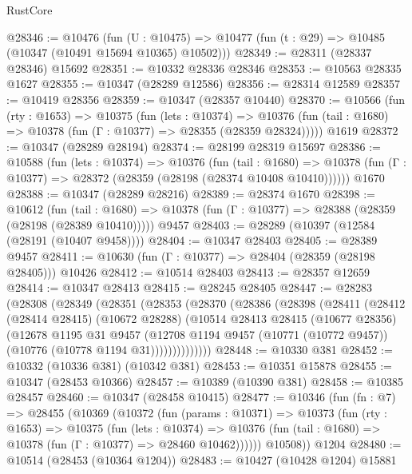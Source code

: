 \begin{lexlean}{RustCore}
\begin{coremodule}
@28346 := @10476
    (fun (U : @10475) => @10477 (fun (t : @29) => @10485 (@10347 (@10491 @15694 @10365) @10502)))
@28349 := @28311 (@28337 @28346) @15692
@28351 := @10332 @28336 @28346
@28353 := @10563 @28335 @1627
@28355 := @10347 (@28289 @12586)
@28356 := @28314 @12589
@28357 := @10419 @28356
@28359 := @10347 (@28357 @10440)
@28370 := @10566
    (fun (rty : @1653) =>
    @10375
      (fun (lets : @10374) =>
      @10376 (fun (tail : @1680) => @10378 (fun (Γ : @10377) => @28355 (@28359 @28324)))))
    @1619
@28372 := @10347 (@28289 @28194)
@28374 := @28199 @28319 @15697
@28386 := @10588
    (fun (lets : @10374) =>
    @10376
      (fun (tail : @1680) =>
      @10378 (fun (Γ : @10377) => @28372 (@28359 (@28198 (@28374 @10408 @10410))))))
    @1670
@28388 := @10347 (@28289 @28216)
@28389 := @28374 @1670
@28398 := @10612
    (fun (tail : @1680) => @10378 (fun (Γ : @10377) => @28388 (@28359 (@28198 (@28389 @10410)))))
    @9457
@28403 := @28289 (@10397 (@12584 (@28191 (@10407 @9458))))
@28404 := @10347 @28403
@28405 := @28389 @9457
@28411 := @10630 (fun (Γ : @10377) => @28404 (@28359 (@28198 @28405))) @10426
@28412 := @10514 @28403
@28413 := @28357 @12659
@28414 := @10347 @28413
@28415 := @28245 @28405
@28447 := @28283
    (@28308
      (@28349
        (@28351
          (@28353
            (@28370
              (@28386
                (@28398
                  (@28411
                    (@28412
                      (@28414 @28415)
                      (@10672 @28288)
                      (@10514
                        @28413
                        @28415
                        (@10677 @28356)
                        (@12678
                          @1195
                          @31
                          @9457
                          (@12708
                            @1194
                            @9457
                            (@10771 (@10772 @9457))
                            (@10776 (@10778 @1194 @31))))))))))))))
@28448 := @10330 @381
@28452 := @10332 (@10336 @381) (@10342 @381)
@28453 := @10351 @15878
@28455 := @10347 (@28453 @10366)
@28457 := @10389 (@10390 @381)
@28458 := @10385 @28457
@28460 := @10347 (@28458 @10415)
@28477 := @10346
    (fun (fn : @7) =>
    @28455
      (@10369
        (@10372
          (fun (params : @10371) =>
          @10373
            (fun (rty : @1653) =>
            @10375
              (fun (lets : @10374) =>
              @10376 (fun (tail : @1680) => @10378 (fun (Γ : @10377) => @28460 @10462))))))
        @10508))
    @1204
@28480 := @10514 (@28453 (@10364 @1204))
@28483 := @10427 (@10428 @1204) @15881

\end{coremodule}
\end{lexlean}
